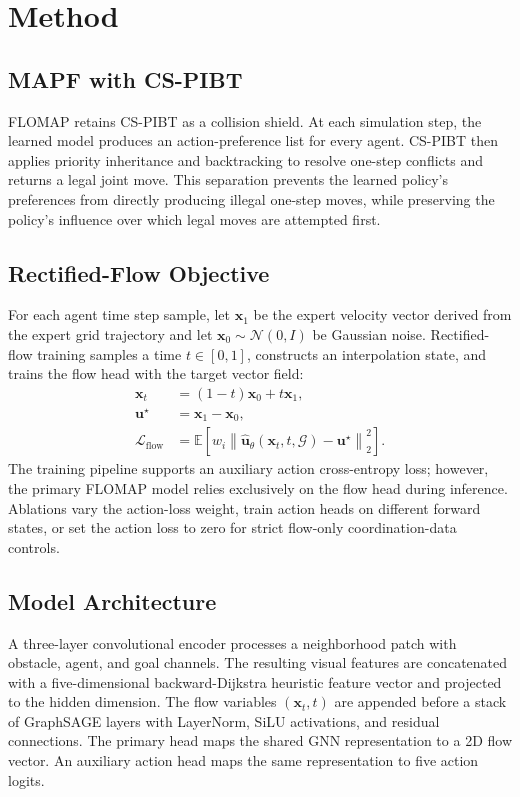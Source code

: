 \documentclass[conference]{IEEEtran}
\begin{document}
\section{Method}

\subsection{MAPF with CS-PIBT}

FLOMAP retains CS-PIBT as a collision shield.  At each simulation step, the
learned model produces an action-preference list for every agent.  CS-PIBT then
applies priority inheritance and backtracking to resolve one-step conflicts and
returns a legal joint move.  This separation prevents the learned policy's
preferences from directly producing illegal one-step moves, while preserving the
policy's influence over which legal moves are attempted first.

\subsection{Rectified-Flow Objective}

For each agent time step sample, let $\mathbf{x}_1$ be the expert velocity vector
derived from the expert grid trajectory and let
$\mathbf{x}_0\sim\mathcal{N}(0,I)$ be Gaussian noise.  Rectified-flow training
samples a time $t\in[0,1]$, constructs an interpolation state, and trains the
flow head with the target vector field:
\begin{align}
\mathbf{x}_t
&=(1-t)\mathbf{x}_0+t\mathbf{x}_1, \\
\mathbf{u}^\star
&=\mathbf{x}_1-\mathbf{x}_0, \\
\mathcal{L}_{\mathrm{flow}}
&=\mathbb{E}\left[w_i\left\|
\hat{\mathbf{u}}_\theta(\mathbf{x}_t,t,\mathcal{G})-\mathbf{u}^\star
\right\|_2^2\right].
\end{align}
The training pipeline supports an auxiliary action cross-entropy loss; however,
the primary FLOMAP model relies exclusively on the flow head during inference.  Ablations
vary the action-loss weight, train action heads on different forward states, or
set the action loss to zero for strict flow-only coordination-data controls.

\subsection{Model Architecture}

A three-layer convolutional encoder processes a neighborhood patch with
obstacle, agent, and goal channels.  The resulting
visual features are concatenated with a five-dimensional backward-Dijkstra
heuristic feature vector and projected to the hidden dimension.  The flow
variables $(\mathbf{x}_t,t)$ are appended before a stack of GraphSAGE layers with
LayerNorm, SiLU activations, and residual connections.  The primary head maps
the shared GNN representation to a 2D flow vector.  An auxiliary
action head maps the same representation to five action logits.
\end{document}
